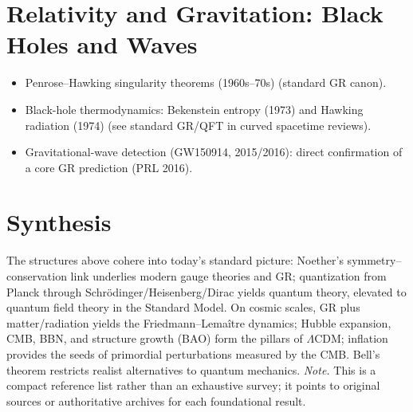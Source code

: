 \documentclass[11pt]{article}
\begin{document}
\section{Relativity and Gravitation: Black Holes and Waves}
\begin{itemize}
  \item Penrose--Hawking singularity theorems (1960s--70s) (standard GR canon).
  \item Black-hole thermodynamics: Bekenstein entropy (1973) and Hawking radiation (1974) (see standard GR/QFT in curved spacetime reviews).
  \item Gravitational-wave detection (GW150914, 2015/2016): direct confirmation of a core GR prediction (PRL 2016).
\end{itemize}
\section{Synthesis}
The structures above cohere into today’s standard picture: Noether’s symmetry--conservation link underlies modern gauge theories and GR; quantization from Planck through Schr\"odinger/Heisenberg/Dirac yields quantum theory, elevated to quantum field theory in the Standard Model. On cosmic scales, GR plus matter/radiation yields the Friedmann--Lema\^itre dynamics; Hubble expansion, CMB, BBN, and structure growth (BAO) form the pillars of $\Lambda$CDM; inflation provides the seeds of primordial perturbations measured by the CMB. Bell’s theorem restricts realist alternatives to quantum mechanics.
\bigskip
\noindent\textit{Note.} This is a compact reference list rather than an exhaustive survey; it points to original sources or authoritative archives for each foundational result.
\newpage
\end{document}
